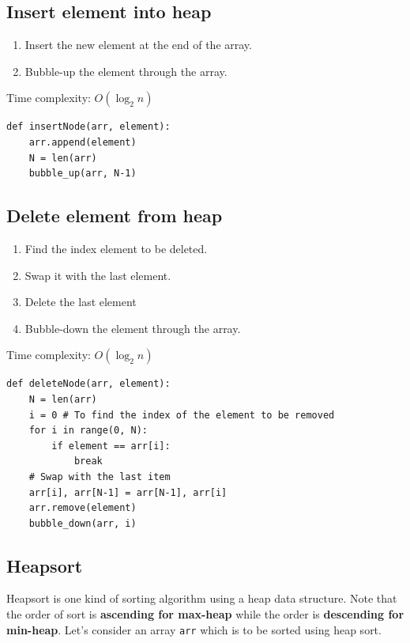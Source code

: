 \documentclass[a4paper,11pt]{book}
\begin{document}
\subsection{Insert element into heap}
\begin{enumerate}
    \item Insert the new element at the end of the array.
    \item Bubble-up the element through the array.
\end{enumerate}
\noindent Time complexity: $O(\log_2 n)$
\begin{lstlisting}
def insertNode(arr, element):
    arr.append(element)
    N = len(arr)
    bubble_up(arr, N-1)
\end{lstlisting}

\subsection{Delete element from heap}
\begin{enumerate}
    \item Find the index element to be deleted.
    \item Swap it with the last element.
    \item Delete the last element
    \item Bubble-down the element through the array.
\end{enumerate}
\noindent Time complexity: $O(\log_2 n)$
\begin{lstlisting}
def deleteNode(arr, element):
    N = len(arr)
    i = 0 # To find the index of the element to be removed
    for i in range(0, N):
        if element == arr[i]:
            break
    # Swap with the last item
    arr[i], arr[N-1] = arr[N-1], arr[i]
    arr.remove(element)
    bubble_down(arr, i)
\end{lstlisting}

\subsection{Heapsort}

\noindent Heapsort is one kind of sorting algorithm using a heap data structure. Note that the order of sort is \textbf{ascending for max-heap} while the order is \textbf{descending for min-heap}. Let's consider an array \lstinline{arr} which is to be sorted using heap sort.
\end{document}
